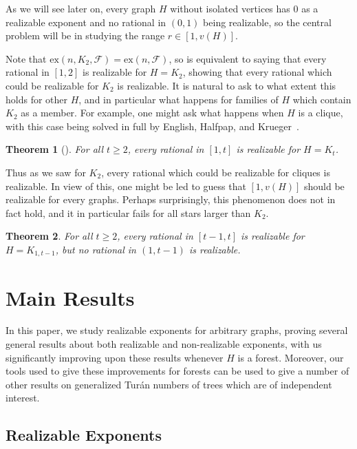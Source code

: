 \documentclass[12pt,letterpaper]{article}
\newtheorem{theorem}{Theorem}[section]
\theoremstyle{definition}
\newcommand{\re}{r} %
\newcommand{\ex}{\mathrm{ex}}
\renewcommand{\c}[1]{\mathcal{#1}}
\begin{document}
	As we will see later on, every graph $H$ without isolated vertices has $0$ as a realizable exponent and no rational in $(0,1)$ being realizable, so the central problem will be in studying the range $\re\in [1,v(H)]$.
	
	Note that $\ex(n,K_2,\c{F})=\ex(n,\c{F})$, so  is equivalent to saying that every rational in $[1,2]$ is realizable for $H=K_2$, showing that every rational which could be realizable for $K_2$ is realizable.  It is natural to ask to what extent this holds for other $H$, and in particular what happens for families of $H$ which contain $K_2$ as a member.  For example, one might ask what happens when $H$ is a clique, with this case being solved in full by  English, Halfpap, and Krueger~\cite{EHK2025}.
	
	\begin{theorem}[\cite{EHK2025}]\label{theorem:cliques}
		For all $t\ge 2$, every rational in $[1,t]$ is realizable for $H=K_t$.
	\end{theorem}
	
	Thus as we saw for $K_2$, every rational which could be realizable for cliques is  realizable. In view of this, one might be led to guess that $[1,v(H)]$ should be realizable for every graphs.  Perhaps surprisingly, this phenomenon does not in fact hold, and it in particular fails for all stars larger than $K_2$.
	
	\begin{theorem}\label{theorem:stars}
		For all $t\ge 2$, every rational in $[t-1,t]$ is realizable for $H=K_{1,t-1}$, but no rational in $(1,t-1)$ is realizable.
	\end{theorem}
	
	
	
	
	
	
	
	
	\section{Main Results}
	In this paper, we study realizable exponents for arbitrary graphs, proving several general results about both realizable and non-realizable exponents, with us significantly improving upon these results whenever $H$ is a forest.  Moreover, our tools used to give these improvements for forests can be used to give a number of other results on generalized Tur\'an numbers of trees which are of independent interest.
	
	\subsection{Realizable Exponents} 
	
\end{document}
